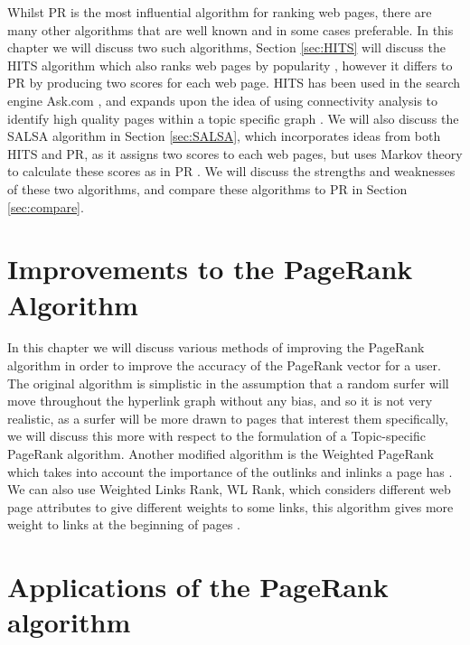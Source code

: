 \documentclass[11pt]{report}
\begin{document}
Whilst PR is the most influential algorithm for ranking web pages, there are many other algorithms that are well known and in some cases preferable. In this chapter we will discuss two such algorithms, Section \ref{sec:HITS} will discuss the HITS algorithm which also ranks web pages by popularity \cite{kleinberg1999authoritative}, however it differs to PR by producing two scores for each web page. HITS has been used in the search engine Ask.com \cite{bonato}, and expands upon the idea of using connectivity analysis to identify high quality pages within a topic specific graph \cite{manning}. We will also discuss the SALSA algorithm in Section \ref{sec:SALSA}, which incorporates ideas from both HITS and PR, as it assigns two scores to each web pages, but uses Markov theory to calculate these scores as in PR \cite{lempel2000stochastic}. We will discuss the strengths and weaknesses of these two algorithms, and compare these algorithms to PR in Section \ref{sec:compare}.




\chapter{Improvements to the PageRank Algorithm} \label{chap:Improve}

In this chapter we will discuss various methods of improving the PageRank algorithm in order to improve the accuracy of the PageRank vector for a user. The original algorithm is simplistic in the assumption that a random surfer will move throughout the hyperlink graph without any bias, and so it is not very realistic, as a surfer will be more drawn to pages that interest them specifically, we will discuss this more with respect to the formulation of a Topic-specific PageRank algorithm. Another modified algorithm is the Weighted PageRank which takes into account the importance of the outlinks and inlinks a page has \cite{xing2004weighted}. We can also use Weighted Links Rank, WL Rank, which considers different web page attributes to give different weights to some links, this algorithm gives more weight to links at the beginning of pages \cite{baeza2004web}.





\chapter{Applications of the PageRank algorithm} \label{chap:Applications}
\end{document}
